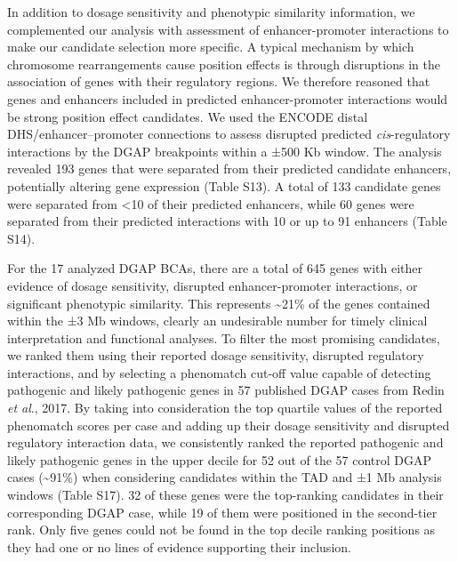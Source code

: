 \documentclass[a4paper,twoside=true,openright,parskip=full,chapterprefix=true,11pt,headings=normal,bibliography=totoc,listof=totoc,titlepage=on,captions=tableabove,draft=false]{scrreprt}
\theoremstyle{definition}
\theoremstyle{definition}
\theoremstyle{definition}
\theoremstyle{remark}
\begin{document}
In addition to dosage sensitivity and phenotypic similarity information,
we complemented our analysis with assessment of enhancer-promoter
interactions to make our candidate selection more specific. A typical
mechanism by which chromosome rearrangements cause position effects is
through disruptions in the association of genes with their regulatory
regions.\citep{Kleinjan2005, Kleinjan1998} We therefore reasoned that
genes and enhancers included in predicted enhancer-promoter interactions
would be strong position effect candidates. We used the ENCODE distal
DHS/enhancer--promoter connections\citep{Thurman2012} to assess
disrupted predicted \emph{cis}-regulatory interactions by the DGAP
breakpoints within a ±500 Kb window. The analysis revealed 193 genes
that were separated from their predicted candidate enhancers,
potentially altering gene expression (Table S13). A total of 133
candidate genes were separated from \textless{}10 of their predicted
enhancers, while 60 genes were separated from their predicted
interactions with 10 or up to 91 enhancers (Table S14).

For the 17 analyzed DGAP BCAs, there are a total of 645 genes with
either evidence of dosage sensitivity, disrupted enhancer-promoter
interactions, or significant phenotypic similarity. This represents
\textasciitilde{}21\% of the genes contained within the ±3 Mb windows,
clearly an undesirable number for timely clinical interpretation and
functional analyses. To filter the most promising candidates, we ranked
them using their reported dosage sensitivity, disrupted regulatory
interactions, and by selecting a phenomatch cut-off value capable of
detecting pathogenic and likely pathogenic genes in 57 published DGAP
cases from Redin \emph{et al}., 2017.\citep{Redin2017} By taking into
consideration the top quartile values of the reported phenomatch scores
per case and adding up their dosage sensitivity and disrupted regulatory
interaction data, we consistently ranked the reported pathogenic and
likely pathogenic genes in the upper decile for 52 out of the 57 control
DGAP cases (\textasciitilde{}91\%) when considering candidates within
the TAD and ±1 Mb analysis windows (Table S17). 32 of these genes were
the top-ranking candidates in their corresponding DGAP case, while 19 of
them were positioned in the second-tier rank. Only five genes could not
be found in the top decile ranking positions as they had one or no lines
of evidence supporting their inclusion.
\end{document}
